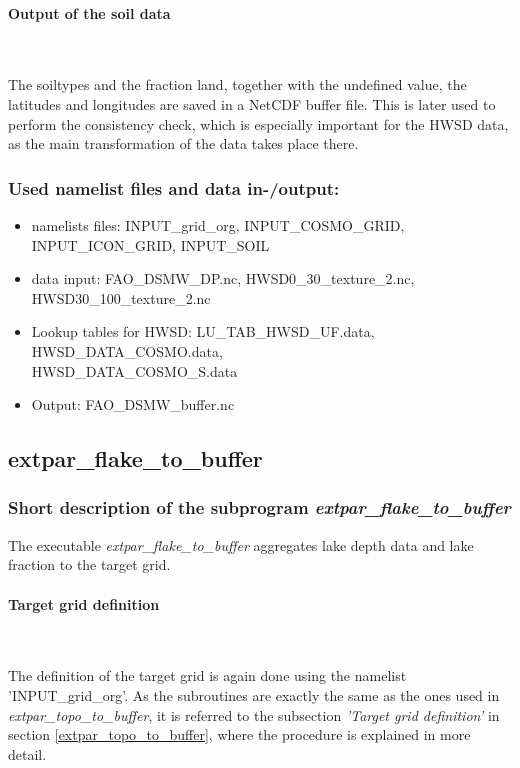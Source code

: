 \documentclass[a4paper,10pt,DIV14,BCOR1cm,titlepage,twoside]{scrartcl}
\begin{document}
\paragraph{Output of the soil data}\ \par\medskip\noindent
The soiltypes and the fraction land, together with the undefined value, the latitudes and longitudes are saved in a NetCDF buffer file. This is later used to perform the consistency check, which is especially important for the HWSD data, as the main transformation of the data takes place there. \par\medskip\noindent
\subsubsection{Used namelist files and data in-/output:}
\begin{itemize}
 \item namelists files: INPUT\_grid\_org, INPUT\_COSMO\_GRID, INPUT\_ICON\_GRID, INPUT\_SOIL
\item data input: FAO\_DSMW\_DP.nc, HWSD0\_30\_texture\_2.nc, HWSD30\_100\_texture\_2.nc
\item Lookup tables for HWSD: LU\_TAB\_HWSD\_UF.data, HWSD\_DATA\_COSMO.data,\\ HWSD\_DATA\_COSMO\_S.data
 \item Output: FAO\_DSMW\_buffer.nc
\end{itemize}
\subsection{extpar\_flake\_to\_buffer}\label{extpar_flake_to_buffer}
\subsubsection{Short description of the subprogram \textit{extpar\_flake\_to\_buffer}}
The executable \textit{extpar\_flake\_to\_buffer} aggregates lake depth data and lake fraction to the target grid.\par\medskip\noindent
\paragraph{Target grid definition} \ \par\medskip\noindent
The definition of the target grid is again done using the namelist 'INPUT\_grid\_org'. As the subroutines are exactly the same as the ones used in \textit{extpar\_topo\_to\_buffer}, it is referred to the subsection \textit{'Target grid definition'} in section \ref{extpar_topo_to_buffer}, where the procedure is explained in more detail. \par\medskip\noindent
\end{document}
